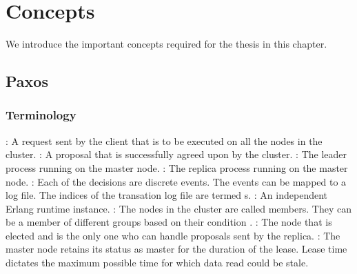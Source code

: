 \chapter{Concepts}
\label{chapter:concepts}

We introduce the important concepts required for the thesis in this chapter.

\section{Paxos}
\label{section:concepts.paxos}

\subsection{Terminology}

\begin{itemize}
    : A request sent by the client that is to be executed on all
    the nodes in the cluster.
    : A proposal that is successfully agreed upon by the
    cluster.
    : The leader process running on the master node.
    : The replica process running on the master node.
    : Each of the decisions are discrete events. The events can be
    mapped to a log file. The indices of the transation log file are termed
    s.
    : An independent Erlang runtime instance.
    : The nodes in the cluster are called members. They can be
    a member of different groups based on their condition%
    .
    : The node that is elected and is the only one who can handle
    proposals sent by the replica.
    : The master node retains its status as master for the duration
    of the lease. Lease time dictates the maximum possible time for which data
    read could be stale.
\end{itemize}

